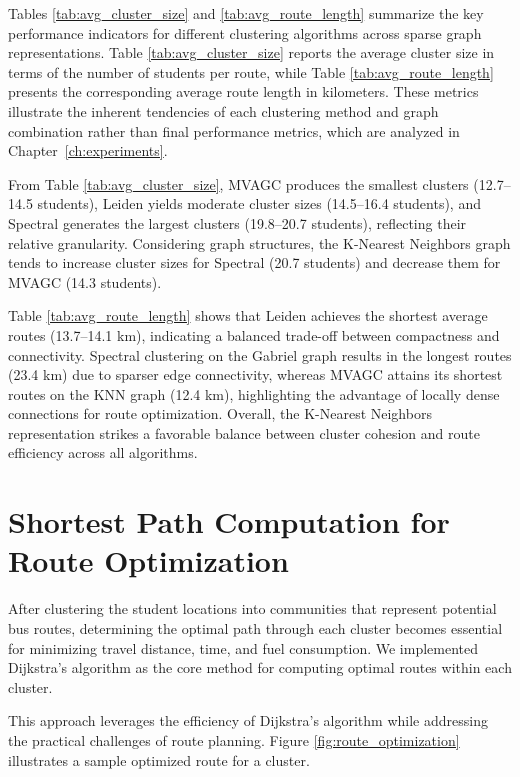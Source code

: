 Tables \ref{tab:avg_cluster_size} and \ref{tab:avg_route_length} summarize the key performance indicators for different clustering algorithms across sparse graph representations. Table \ref{tab:avg_cluster_size} reports the average cluster size in terms of the number of students per route, while Table \ref{tab:avg_route_length} presents the corresponding average route length in kilometers. These metrics illustrate the inherent tendencies of each clustering method and graph combination rather than final performance metrics, which are analyzed in Chapter~\ref{ch:experiments}.

From Table \ref{tab:avg_cluster_size}, MVAGC produces the smallest clusters (12.7--14.5 students), Leiden yields moderate cluster sizes (14.5--16.4 students), and Spectral generates the largest clusters (19.8--20.7 students), reflecting their relative granularity. Considering graph structures, the K-Nearest Neighbors graph tends to increase cluster sizes for Spectral (20.7 students) and decrease them for MVAGC (14.3 students).

Table \ref{tab:avg_route_length} shows that Leiden achieves the shortest average routes (13.7--14.1 km), indicating a balanced trade-off between compactness and connectivity. Spectral clustering on the Gabriel graph results in the longest routes (23.4 km) due to sparser edge connectivity, whereas MVAGC attains its shortest routes on the KNN graph (12.4 km), highlighting the advantage of locally dense connections for route optimization. Overall, the K-Nearest Neighbors representation strikes a favorable balance between cluster cohesion and route efficiency across all algorithms.

\section{Shortest Path Computation for Route Optimization}
\label{sec:shortest_path}

After clustering the student locations into communities that represent potential bus routes, determining the optimal path through each cluster becomes essential for minimizing travel distance, time, and fuel consumption. We implemented Dijkstra's algorithm as the core method for computing optimal routes within each cluster.

This approach leverages the efficiency of Dijkstra's algorithm while addressing the practical challenges of route planning. Figure \ref{fig:route_optimization} illustrates a sample optimized route for a cluster.

